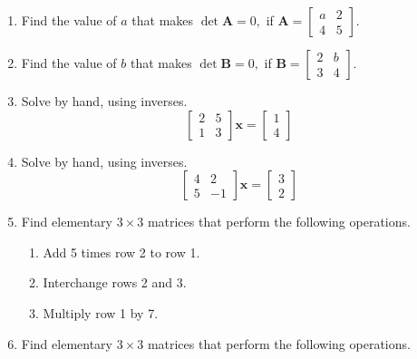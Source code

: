 \documentclass[
]{book}
\providecommand{\tightlist}{%
  \setlength{\itemsep}{0pt}\setlength{\parskip}{0pt}}
\theoremstyle{definition}
\theoremstyle{definition}
\theoremstyle{definition}
\theoremstyle{definition}
\theoremstyle{remark}
\begin{document}
\begin{enumerate}
\item
  Find the value of \(a\) that makes \(\det\mathbf{A}=0,\) if \(\mathbf{A}=\begin{bmatrix} a & 2\\4 & 5\end{bmatrix}.\)
\item
  Find the value of \(b\) that makes \(\det\mathbf{B}=0,\) if \(\mathbf{B}=\begin{bmatrix} 2 & b\\3 & 4\end{bmatrix}.\)
\item
  Solve by hand, using inverses.
  \[\begin{bmatrix} 2 & 5\\1 & 3\end{bmatrix}\mathbf{x}=\begin{bmatrix}1\\4\end{bmatrix}\]
\item
  Solve by hand, using inverses.
  \[\begin{bmatrix} 4 & 2\\5 & -1\end{bmatrix}\mathbf{x}=\begin{bmatrix}3\\2\end{bmatrix}\]
\item
  Find elementary \(3\times 3\) matrices that perform the following operations.

  \begin{enumerate}
  \def\labelenumii{\alph{enumii}.}
  \tightlist
  \item
    Add 5 times row 2 to row 1.
  \item
    Interchange rows 2 and 3.
  \item
    Multiply row 1 by 7.
  \end{enumerate}
\item
  Find elementary \(3\times 3\) matrices that perform the following operations.


\end{enumerate}
\end{document}
